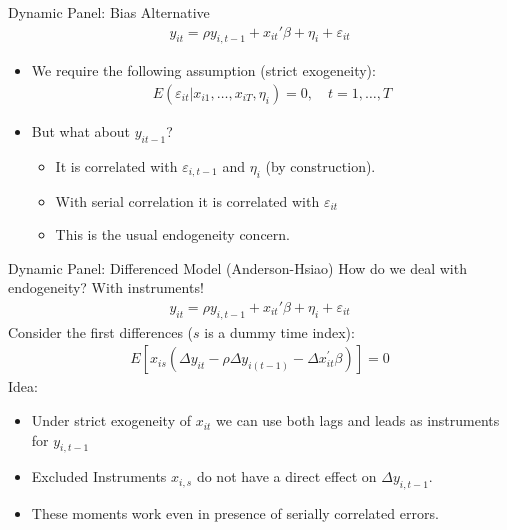 \documentclass[xcolor=pdftex,dvipsnames,table,mathserif,aspectratio=169]{beamer}
\begin{document}
\begin{frame}{Dynamic Panel: Bias Alternative}
\begin{eqnarray*}
y_{it} = \rho y_{i,t-1} + x_{it}'\beta + \eta_i + \varepsilon_{it}
\end{eqnarray*}
\begin{itemize}
\item We require the following assumption (\alert{strict exogeneity}):
\begin{eqnarray*}
E\left(\varepsilon_{i t} | x_{i 1}, \ldots, x_{i T}, \eta_{i}\right)=0, \quad t=1, \ldots, T
\end{eqnarray*}
\item But what about $y_{it-1}$? 
\begin{itemize}
\item It is correlated with $\varepsilon_{i,t-1}$ and $\eta_i$ (by construction).
\item With serial correlation it is correlated with $\varepsilon_{it}$
\item This is the usual \alert{endogeneity} concern.
\end{itemize}
\end{itemize}
\end{frame}



\begin{frame}{Dynamic Panel: Differenced Model (Anderson-Hsiao)}
How do we deal with endogeneity? With \alert{instruments}!
\begin{eqnarray*}
y_{it} = \rho y_{i,t-1} + x_{it}'\beta + \eta_i + \varepsilon_{it}
\end{eqnarray*}
Consider the first differences ($s$ is a dummy time index):
\begin{eqnarray*}
E\left[x_{i s}\left(\Delta y_{i t}-\rho \Delta y_{i(t-1)}-\Delta x_{i t}^{\prime} \beta\right)\right]=0
\end{eqnarray*}
Idea:
\begin{itemize}
\item Under \alert{strict exogeneity} of $x_{it}$ we can use both \alert{lags} and \alert{leads} as instruments for $y_{i,t-1}$
\item \alert{Excluded Instruments} $x_{i,s}$ do not have a direct effect on $\Delta y_{i,t-1}$.
\item These moments work even in presence of \alert{serially correlated errors}.
\end{itemize}
\end{frame}
\end{document}
